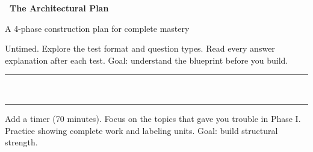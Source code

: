 
\thispagestyle{empty}

{
\sffamily

\begin{center}
    \textcolor{funBlueDark}{\fontsize{26}{30}\selectfont\bfseries
    \faDraftingCompass~The Architectural Plan~\faDraftingCompass}

    \smallskip
    \textcolor{funGray}{\normalsize A 4-phase construction plan for complete mastery}
\end{center}

\vspace{2mm}

\noindent
\begin{tcolorbox}[
    enhanced,
    colback=funBlue!5,
    colframe=funBlue!40,
    arc=4pt, boxrule=1.5pt,
    left=5mm, right=5mm, top=3mm, bottom=3mm,
    title={\textcolor{white}{Phase I: Foundation (Tests 1--3)}},
    colbacktitle=funBlue!65,
    fonttitle=\bfseries\sffamily,
    borderline west={3pt}{0pt}{funBlue!60},
]
    \small
    Untimed. Explore the test format and question types.
    Read every answer explanation after each test.
    Goal: understand the blueprint before you build.
\end{tcolorbox}

\vspace{1mm}
\begin{center}
    \textcolor{funBlue!30}{\rule{0.3\linewidth}{0.4pt}}
    \textcolor{funBlue!50}{~\faAngleDoubleDown~}
    \textcolor{funBlue!30}{\rule{0.3\linewidth}{0.4pt}}
\end{center}
\vspace{1mm}

\noindent
\begin{tcolorbox}[
    enhanced,
    colback=funTeal!5,
    colframe=funTeal!40,
    arc=4pt, boxrule=1.5pt,
    left=5mm, right=5mm, top=3mm, bottom=3mm,
    title={\textcolor{white}{Phase II: Framework (Tests 4--6)}},
    colbacktitle=funTeal!65,
    fonttitle=\bfseries\sffamily,
    borderline west={3pt}{0pt}{funTeal!60},
]
    \small
    Add a timer (70 minutes). Focus on the topics that gave you
    trouble in Phase I. Practice showing complete work and labeling units.
    Goal: build structural strength.
\end{tcolorbox}

}
